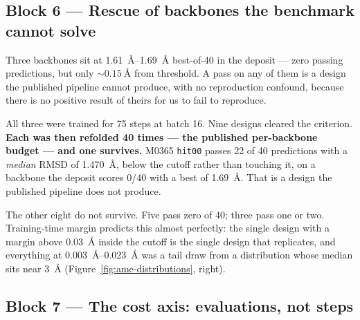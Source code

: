 \subsection*{Block 6 --- Rescue of backbones the benchmark cannot solve}

Three backbones sit at \SIrange{1.61}{1.69}{\angstrom} best-of-40 in the deposit
--- zero passing predictions, but only ${\sim}\SI{0.15}{\angstrom} $ from
threshold. A pass on any of them is a design the published pipeline cannot
produce, with no reproduction confound, because there is no positive result of
theirs for us to fail to reproduce.

All three were trained for 75 steps at batch 16. Nine designs cleared the
criterion. \textbf{Each was then refolded 40 times --- the published
per-backbone budget --- and one survives.} M0365 \texttt{hit00} passes
\num{22} of \num{40} predictions with a \emph{median} RMSD of
\SI{1.470}{\angstrom}, below the cutoff rather than touching it, on a backbone
the deposit scores 0/40 with a best of \SI{1.69}{\angstrom}. That is a design
the published pipeline does not produce.

The other eight do not survive. Five pass zero of 40; three pass one or two.
Training-time margin predicts this almost perfectly: the single design with a
margin above \SI{0.03}{\angstrom} inside the cutoff is the single design that
replicates, and everything at \SIrange{0.003}{0.023}{\angstrom} was a tail draw
from a distribution whose median sits near \SI{3}{\angstrom}
(Figure~\ref{fig:ame-distributions}, right).


\subsection*{Block 7 --- The cost axis: evaluations, not steps}

